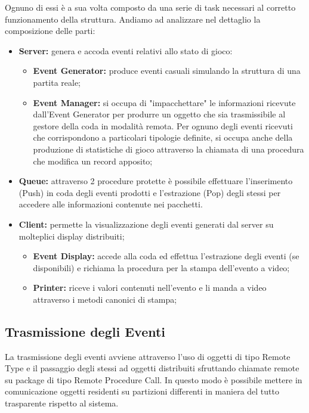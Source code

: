 \documentclass[aps,letterpaper,10pt]{article}
\begin{document}
Ognuno di essi \`e a sua volta composto da una serie di task necessari al corretto funzionamento della struttura. Andiamo ad analizzare nel dettaglio la composizione delle parti:

\begin{itemize}
	\item \textbf{Server:} genera e accoda eventi relativi allo stato di gioco:
		\begin{itemize}
			\item \textbf{Event Generator:} produce eventi casuali simulando la struttura di una partita reale;
			\item \textbf{Event Manager:} si occupa di "impacchettare" le informazioni ricevute dall'Event Generator per produrre un oggetto che sia trasmissibile al gestore della coda in modalit\`a remota. Per ognuno degli eventi ricevuti che corrispondono a particolari tipologie definite, si occupa anche della produzione di statistiche di gioco attraverso la chiamata di una procedura che modifica un record apposito;
		\end{itemize}
	\item \textbf{Queue:} attraverso 2 procedure protette \`e possibile effettuare l'inserimento (Push) in coda degli eventi prodotti e l'estrazione (Pop) degli stessi per accedere alle informazioni contenute nei pacchetti.
	\item \textbf{Client:} permette la visualizzazione degli eventi generati dal server su molteplici display distribuiti;
		\begin{itemize}
		\item \textbf{Event Display:} accede alla coda ed effettua l'estrazione degli eventi (se disponibili) e richiama la procedura per la stampa dell'evento a video;
		\item \textbf{Printer:} riceve i valori contenuti nell'evento e li manda a video attraverso i metodi canonici di stampa;
		\end{itemize}
\end{itemize}

\subsection{Trasmissione degli Eventi}

La trasmissione degli eventi avviene attraverso l'uso di oggetti di tipo Remote Type e il passaggio degli stessi ad oggetti distribuiti sfruttando chiamate remote su package di tipo Remote Procedure Call. In questo modo \`e possibile mettere in comunicazione oggetti residenti su partizioni differenti in maniera del tutto trasparente rispetto al sistema. \vspace{3mm}
\end{document}
